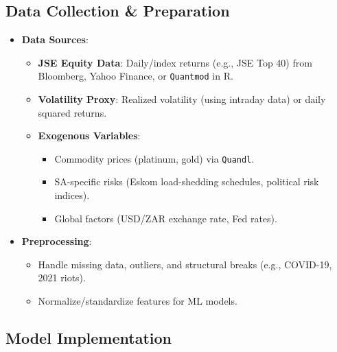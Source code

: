 \documentclass[11pt,preprint]{elsarticle}
\numberwithin{equation}{section}
\numberwithin{figure}{section}
\numberwithin{table}{section}
\def\tightlist{} %
\begin{document}
\subsection{Data Collection \&
Preparation}\label{data-collection-preparation}

\begin{itemize}
\tightlist
\item
  \textbf{Data Sources}:

  \begin{itemize}
  \tightlist
  \item
    \textbf{JSE Equity Data}: Daily/index returns (e.g., JSE Top 40)
    from Bloomberg, Yahoo Finance, or \texttt{Quantmod} in R.\\
  \item
    \textbf{Volatility Proxy}: Realized volatility (using intraday data)
    or daily squared returns.\\
  \item
    \textbf{Exogenous Variables}:

    \begin{itemize}
    \tightlist
    \item
      Commodity prices (platinum, gold) via \texttt{Quandl}.\\
    \item
      SA-specific risks (Eskom load-shedding schedules, political risk
      indices).\\
    \item
      Global factors (USD/ZAR exchange rate, Fed rates).
    \end{itemize}
  \end{itemize}
\item
  \textbf{Preprocessing}:

  \begin{itemize}
  \tightlist
  \item
    Handle missing data, outliers, and structural breaks (e.g.,
    COVID-19, 2021 riots).\\
  \item
    Normalize/standardize features for ML models.
  \end{itemize}
\end{itemize}

\subsection{Model Implementation}\label{model-implementation}
\end{document}
